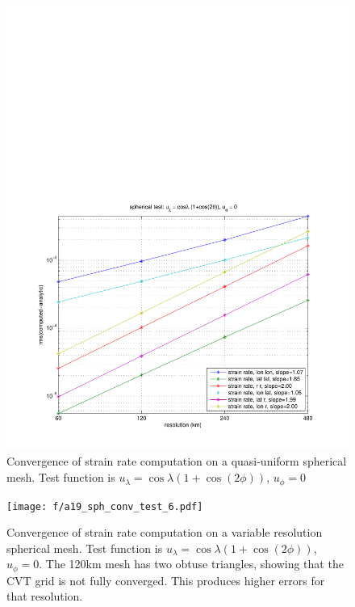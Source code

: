 \documentclass[11pt]{report}
\begin{document}
\begin{figure}[htbp]
 \center
 \includegraphics[scale=0.8, trim = 0 0 0 4in, clip]{f/a19_sph_conv_test_1.pdf}
 \caption{Convergence of strain rate computation on a quasi-uniform spherical mesh.  Test function is $u_{\lambda}=\cos \lambda (1+\cos(2\phi))$, $u_{\phi}=0$}
 \label{fig:convergence1}
\end{figure}

\begin{figure}[htbp]
 \center
 \texttt{[image: f/a19\_sph\_conv\_test\_6.pdf]}
 \caption{Convergence of strain rate computation on a variable resolution spherical mesh.  Test function is $u_{\lambda}=\cos \lambda (1+\cos(2\phi))$, $u_{\phi}=0$.  The 120km mesh has two obtuse triangles, showing that the CVT grid is not fully converged.  This produces higher errors for that resolution.}
 \label{fig:convergence1b}
\end{figure}
\end{document}
